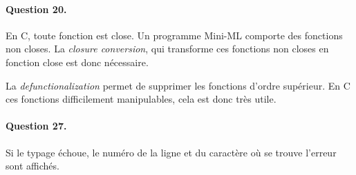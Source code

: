 \documentclass[12pt]{article}
\begin{document}
\paragraph{Question 20.}

En C, toute fonction est close. Un programme Mini-ML comporte des fonctions non closes. La \textit{closure conversion}, qui transforme ces fonctions non closes en fonction close est donc nécessaire.

La \textit{defunctionalization} permet de supprimer les fonctions d'ordre supérieur. En C ces fonctions difficilement manipulables, cela est donc très utile.



\paragraph{Question 27.}

Si le typage échoue, le numéro de la ligne et du caractère où se trouve l'erreur sont affichés.
\end{document}
